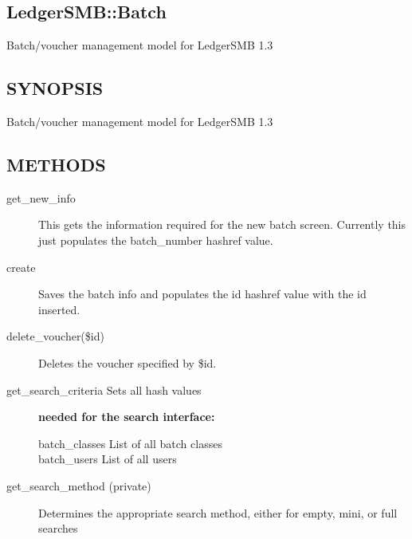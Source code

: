 \begin{description}
\begin{description}
\begin{description}
\begin{description}
\begin{description}
\begin{description}
\begin{description}
\section{LedgerSMB::Batch\label{LedgerSMB::Batch}}


Batch/voucher management model for LedgerSMB 1.3

\subsection*{SYNOPSIS\label{LedgerSMB::Batch_SYNOPSIS}}


Batch/voucher management model for LedgerSMB 1.3

\subsection*{METHODS\label{LedgerSMB::Batch_METHODS}}
\begin{description}

\item[{get\_new\_info}] \mbox{}

This gets the information required for the new batch screen.  Currently this
just populates the batch\_number hashref value.


\item[{create}] \mbox{}

Saves the batch info and populates the id hashref value with the id inserted.


\item[{delete\_voucher(\$id)}] \mbox{}

Deletes the voucher specified by \$id.


\item[{get\_search\_criteria Sets all hash values}] \textbf{needed for the search interface:}\begin{description}

\item[{batch\_classes List of all batch classes}] \mbox{}
\item[{batch\_users
List of all users}] \mbox{}\end{description}

\item[{get\_search\_method (private)}] \mbox{}

Determines the appropriate search method, either for empty, mini, or full 
searches




\end{description}
\end{description}
\end{description}
\end{description}
\end{description}
\end{description}
\end{description}
\end{description}
